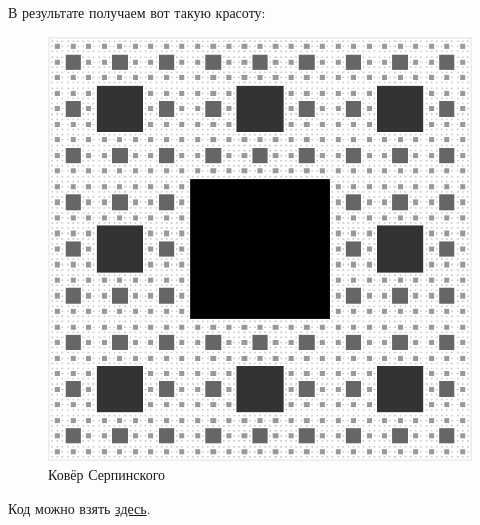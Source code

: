 \documentclass{ncc}
\begin{document}
В результате получаем вот такую красоту:

\begin{figure}[h]
    \center
    \includegraphics[width=.5\textwidth]{2015-09-06-sierpinski-carpet-and-shader-sierpinski.png}
    \caption{Ковёр Серпинского}
\end{figure}

Код можно взять \href{https://github.com/citrux/sierpinski-carpet}{здесь}.
\end{document}
